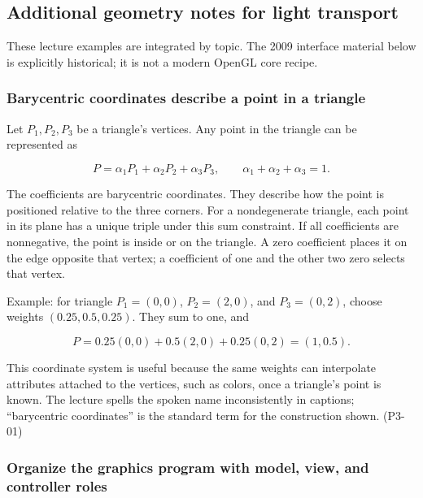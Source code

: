 \subsection{Additional geometry notes for light transport}\label{03-visual-computing-i-ch018-additional-geometry-notes-for-light-transport}

\hypertarget{03-visual-computing-i-ch018-additional-geometry-notes-for-light-transport}{}

These lecture examples are integrated by topic. The 2009 interface material below is explicitly historical; it is not a modern OpenGL core recipe.

\subsubsection{Barycentric coordinates describe a point in a triangle}\label{03-visual-computing-i-ch018-barycentric-coordinates-describe-a-point-in-a-triangle}

\hypertarget{03-visual-computing-i-ch018-barycentric-coordinates-describe-a-point-in-a-triangle}{}

Let \(P_1,P_2,P_3\) be a triangle's vertices. Any point in the triangle can be represented as

\[
P=\alpha_1P_1+\alpha_2P_2+\alpha_3P_3,
\qquad \alpha_1+\alpha_2+\alpha_3=1.
\]

The coefficients are barycentric coordinates. They describe how the point is positioned relative to the three corners. For a nondegenerate triangle, each point in its plane has a unique triple under this sum constraint. If all coefficients are nonnegative, the point is inside or on the triangle. A zero coefficient places it on the edge opposite that vertex; a coefficient of one and the other two zero selects that vertex.

Example: for triangle \(P_1=(0,0)\), \(P_2=(2,0)\), and \(P_3=(0,2)\), choose weights \((0.25,0.5,0.25)\). They sum to one, and

\[
P=0.25(0,0)+0.5(2,0)+0.25(0,2)=(1,0.5).
\]

This coordinate system is useful because the same weights can interpolate attributes attached to the vertices, such as colors, once a triangle's point is known. The lecture spells the spoken name inconsistently in captions; ``barycentric coordinates'' is the standard term for the construction shown. (P3-01)

\subsubsection{Organize the graphics program with model, view, and controller roles}\label{03-visual-computing-i-ch018-organize-the-graphics-program-with-model-view-and-controller-roles}

